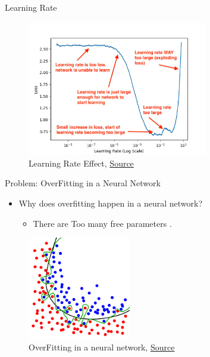 \documentclass[compress,oilve,t]{beamer}
\newcommand{\tc}[2]{
	\textcolor{#1}{\hspace{-2pt}#2\hspace{-2pt}}
}
\begin{document}
\begin{frame}{Learning Rate}
	\begin{figure}[H]
		\centering
		\includegraphics[width=0.7\textwidth]{Figs/lr_high_res_2.jpg}
		\caption{Learning Rate Effect, \href{https://pyimagesearch.com/2019/08/05/keras-learning-rate-finder/}{Source}}
	\end{figure}
\end{frame}


\begin{frame}{Problem: OverFitting in a Neural Network}
	\begin{itemize}
		\item Why does overfitting happen in a neural network?
		\begin{itemize}
			\item There are \tc{keywords}{Too many free parameters}.
		\end{itemize}
	\end{itemize}
	\begin{figure}[H]
		\centering
		\includegraphics[width=0.4\textwidth]{Figs/section_4/overfitting.png}
		\caption{OverFitting in a neural network, \href{https://en.wikipedia.org/wiki/Overfitting}{Source}}
	\end{figure}
\end{frame}
\end{document}
